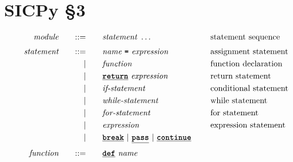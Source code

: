 \section*{SICPy \S3}

\begin{alignat*}{9}
&& \textit{module}    &&\quad ::= &\quad && \textit{statement} \ \ldots
                                                           && \textrm{{statement sequence}} \\[1mm]
&& \textit{statement}    &&\quad ::= &\quad && \textit{name} \ \textbf{\texttt{=}}\  \textit{expression} \
                                                           && \textrm{assignment statement} \\
&&                       && |   &\quad && \textit{function} \quad
                                                           && \textrm{function declaration}\\
&&                       && |   &\quad && \textbf{\texttt{\underline{return}}}\  \textit{expression} \
                                                           && \textrm{return statement}\\
&&                       && |   &\quad && \textit{if-statement} \quad
                                                           && \textrm{conditional statement}\\
&&                       && |   &\quad && \textit{while-statement} \quad
                                                           && \textrm{while statement}\\
&&                       && |   &\quad && \textit{for-statement} \quad
                                                           && \textrm{for statement}\\
&&                       && |   &\quad &&  \textit{expression} \ 
                                                           && \textrm{expression statement} \\
&&                       && |   &\quad && \textbf{\texttt{\underline{break}}} \ | \ \textbf{\texttt{\underline{pass}}} \ | \ \textbf{\texttt{\underline{continue}}} \ \quad &&  \\[1mm]
&& \textit{function} && ::=&\quad && \textbf{\texttt{\underline{def}}}\  \textit{name} \ 

\end{alignat*}
